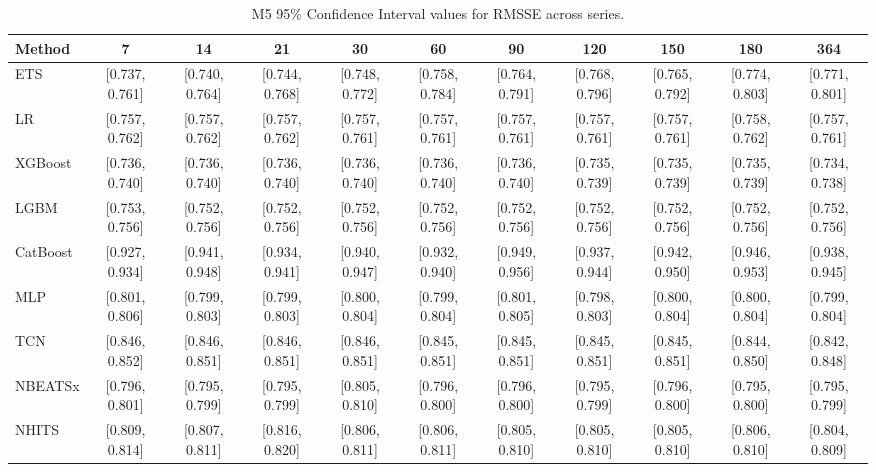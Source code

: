 \begin{table}[!ht]
\centering
\begin{adjustbox}{max width=\textwidth}
\begin{tabular}{lcccccccccc}
\toprule
Method & 7 & 14 & 21 & 30 & 60 & 90 & 120 & 150 & 180 & 364 \\
\midrule
ETS & [0.737, 0.761] & [0.740, 0.764] & [0.744, 0.768] & [0.748, 0.772] & [0.758, 0.784] & [0.764, 0.791] & [0.768, 0.796] & [0.765, 0.792] & [0.774, 0.803] & [0.771, 0.801] \\
LR & [0.757, 0.762] & [0.757, 0.762] & [0.757, 0.762] & [0.757, 0.761] & [0.757, 0.761] & [0.757, 0.761] & [0.757, 0.761] & [0.757, 0.761] & [0.758, 0.762] & [0.757, 0.761] \\
XGBoost & [0.736, 0.740] & [0.736, 0.740] & [0.736, 0.740] & [0.736, 0.740] & [0.736, 0.740] & [0.736, 0.740] & [0.735, 0.739] & [0.735, 0.739] & [0.735, 0.739] & [0.734, 0.738] \\
LGBM & [0.753, 0.756] & [0.752, 0.756] & [0.752, 0.756] & [0.752, 0.756] & [0.752, 0.756] & [0.752, 0.756] & [0.752, 0.756] & [0.752, 0.756] & [0.752, 0.756] & [0.752, 0.756] \\
CatBoost & [0.927, 0.934] & [0.941, 0.948] & [0.934, 0.941] & [0.940, 0.947] & [0.932, 0.940] & [0.949, 0.956] & [0.937, 0.944] & [0.942, 0.950] & [0.946, 0.953] & [0.938, 0.945] \\
MLP & [0.801, 0.806] & [0.799, 0.803] & [0.799, 0.803] & [0.800, 0.804] & [0.799, 0.804] & [0.801, 0.805] & [0.798, 0.803] & [0.800, 0.804] & [0.800, 0.804] & [0.799, 0.804] \\
TCN & [0.846, 0.852] & [0.846, 0.851] & [0.846, 0.851] & [0.846, 0.851] & [0.845, 0.851] & [0.845, 0.851] & [0.845, 0.851] & [0.845, 0.851] & [0.844, 0.850] & [0.842, 0.848] \\
NBEATSx & [0.796, 0.801] & [0.795, 0.799] & [0.795, 0.799] & [0.805, 0.810] & [0.796, 0.800] & [0.796, 0.800] & [0.795, 0.799] & [0.796, 0.800] & [0.795, 0.800] & [0.795, 0.799] \\
NHITS & [0.809, 0.814] & [0.807, 0.811] & [0.816, 0.820] & [0.806, 0.811] & [0.806, 0.811] & [0.805, 0.810] & [0.805, 0.810] & [0.805, 0.810] & [0.806, 0.810] & [0.804, 0.809] \\
\bottomrule
\end{tabular}
\end{adjustbox}
\caption{M5 95\% Confidence Interval values for RMSSE across series.}
\label{tab:ci_m5_rmsse}
\end{table}

